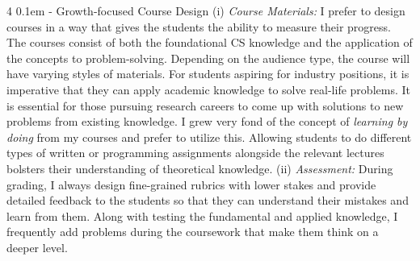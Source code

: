 \documentclass[9pt]{article}
\makeatletter
\def \paragraph {%
    \@startsection{paragraph}%
        {4}%
        \z@%
        {0.1em}
        {-\fontdimen 6 \font}%
        {\normalfont \bfseries}%
    }
\makeatother
\begin{document}
\paragraph{Growth-focused Course Design}
(i) \textit{Course Materials:} I prefer to design courses in a way that gives the students the ability to measure their progress. 
%
The courses consist of both the foundational CS knowledge and the application of the concepts to problem-solving. Depending on the audience type, 
the course will have varying styles of materials.
For students aspiring for industry positions, it is imperative that they can apply academic knowledge to solve real-life problems. It is essential for those pursuing research careers to come up with solutions to new problems from existing knowledge.
I grew very fond of the concept of \textit{learning by doing} from my courses and prefer to utilize this. Allowing students to do different types of written or programming assignments alongside the relevant lectures bolsters their understanding of theoretical knowledge.
%
%
(ii) \textit{Assessment:} During grading, I always design fine-grained rubrics with lower stakes and provide detailed feedback to the students so that they can understand their mistakes and learn from them. Along with testing the fundamental and applied knowledge, I frequently add problems during the coursework that make them think on a deeper level. 

\end{document}
